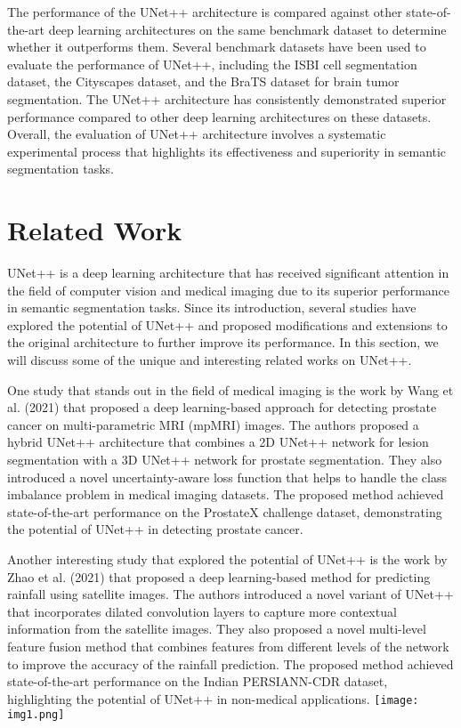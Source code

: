 \documentclass[conference]{IEEEtran}
\begin{document}
The performance of the UNet++ architecture is compared against other state-of-the-art deep learning architectures on the same benchmark dataset to determine whether it outperforms them. Several benchmark datasets have been used to evaluate the performance of UNet++, including the ISBI cell segmentation dataset, the Cityscapes dataset, and the BraTS dataset for brain tumor segmentation. The UNet++ architecture has consistently demonstrated superior performance compared to other deep learning architectures on these datasets. Overall, the evaluation of UNet++ architecture involves a systematic experimental process that highlights its effectiveness and superiority in semantic segmentation tasks.

\section{Related Work}
UNet++ is a deep learning architecture that has received significant attention in the field of computer vision and medical imaging due to its superior performance in semantic segmentation tasks. Since its introduction, several studies have explored the potential of UNet++ and proposed modifications and extensions to the original architecture to further improve its performance. In this section, we will discuss some of the unique and interesting related works on UNet++.


One study that stands out in the field of medical imaging is the work by Wang et al. (2021) that proposed a deep learning-based approach for detecting prostate cancer on multi-parametric MRI (mpMRI) images. The authors proposed a hybrid UNet++ architecture that combines a 2D UNet++ network for lesion segmentation with a 3D UNet++ network for prostate segmentation. They also introduced a novel uncertainty-aware loss function that helps to handle the class imbalance problem in medical imaging datasets. The proposed method achieved state-of-the-art performance on the ProstateX challenge dataset, demonstrating the potential of UNet++ in detecting prostate cancer.

Another interesting study that explored the potential of UNet++ is the work by Zhao et al. (2021) that proposed a deep learning-based method for predicting rainfall using satellite images. The authors introduced a novel variant of UNet++ that incorporates dilated convolution layers to capture more contextual information from the satellite images. They also proposed a novel multi-level feature fusion method that combines features from different levels of the network to improve the accuracy of the rainfall prediction. The proposed method achieved state-of-the-art performance on the Indian PERSIANN-CDR dataset, highlighting the potential of UNet++ in non-medical applications.
\texttt{[image: img1.png]}
\end{document}
